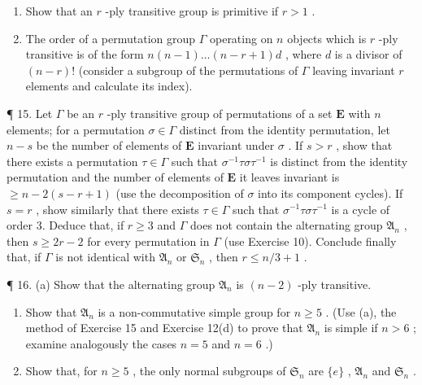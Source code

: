 \begin{enumerate}
\def\labelenumi{(\alph{enumi})}
\item
  Show that an \(r\) -ply transitive group is primitive if \(r > 1\) .
\item
  The order of a permutation group \(\Gamma\) operating on \(n\) objects which is \(r\) -ply transitive is of the form \(n(n - 1)\ldots (n - r + 1)d\) , where \(d\) is a divisor of \((n - r)!\) (consider a subgroup of the permutations of \(\Gamma\) leaving invariant \(r\) elements and calculate its index).
\end{enumerate}

¶ 15. Let \(\Gamma\) be an \(r\) -ply transitive group of permutations of a set \(\mathbf{E}\) with \(n\) elements; for a permutation \(\sigma \in \Gamma\) distinct from the identity permutation, let \(n - s\) be the number of elements of \(\mathbf{E}\) invariant under \(\sigma\) . If \(s > r\) , show that there exists a permutation \(\tau \in \Gamma\) such that \(\sigma^{-1}\tau \sigma \tau^{-1}\) is distinct from the identity permutation and the number of elements of \(\mathbf{E}\) it leaves invariant is \(\geqslant n - 2(s - r + 1)\) (use the decomposition of \(\sigma\) into its component cycles). If \(s = r\) , show similarly that there exists \(\tau \in \Gamma\) such that \(\sigma^{-1}\tau \sigma \tau^{-1}\) is a cycle of order 3. Deduce that, if \(r \geqslant 3\) and \(\Gamma\) does not contain the alternating group \(\mathfrak{A}_n\) , then \(s \geqslant 2r - 2\) for every permutation in \(\Gamma\) (use Exercise 10). Conclude finally that, if \(\Gamma\) is not identical with \(\mathfrak{A}_n\) or \(\mathfrak{S}_n\) , then \(r \leqslant n/3 + 1\) .

¶ 16. (a) Show that the alternating group \(\mathfrak{A}_n\) is \((n - 2)\) -ply transitive.

\begin{enumerate}
\def\labelenumi{(\alph{enumi})}
\setcounter{enumi}{1}
\item
  Show that \(\mathfrak{A}_n\) is a non-commutative simple group for \(n \geqslant 5\) . (Use (a), the method of Exercise 15 and Exercise 12(d) to prove that \(\mathfrak{A}_n\) is simple if \(n > 6\) ; examine analogously the cases \(n = 5\) and \(n = 6\) .)
\item
  Show that, for \(n \geqslant 5\) , the only normal subgroups of \(\mathfrak{S}_n\) are \(\{e\}\) , \(\mathfrak{A}_n\) and \(\mathfrak{S}_n\) .
\end{enumerate}

